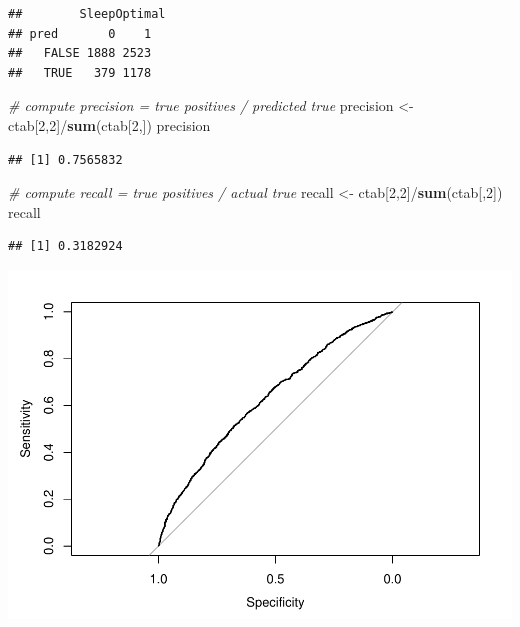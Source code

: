 \documentclass[]{article}
\newenvironment{Shaded}{\begin{snugshade}}{\end{snugshade}}
\newcommand{\KeywordTok}[1]{\textcolor[rgb]{0.13,0.29,0.53}{\textbf{{#1}}}}
\newcommand{\DecValTok}[1]{\textcolor[rgb]{0.00,0.00,0.81}{{#1}}}
\newcommand{\StringTok}[1]{\textcolor[rgb]{0.31,0.60,0.02}{{#1}}}
\newcommand{\CommentTok}[1]{\textcolor[rgb]{0.56,0.35,0.01}{\textit{{#1}}}}
\newcommand{\NormalTok}[1]{{#1}}
\begin{document}
\begin{verbatim}
##        SleepOptimal
## pred       0    1
##   FALSE 1888 2523
##   TRUE   379 1178
\end{verbatim}

\begin{Shaded}
\begin{Highlighting}[]
\CommentTok{# compute precision = true positives / predicted true}
\NormalTok{precision <-}\StringTok{ }\NormalTok{ctab[}\DecValTok{2}\NormalTok{,}\DecValTok{2}\NormalTok{]/}\KeywordTok{sum}\NormalTok{(ctab[}\DecValTok{2}\NormalTok{,])}
\NormalTok{precision}
\end{Highlighting}
\end{Shaded}

\begin{verbatim}
## [1] 0.7565832
\end{verbatim}

\begin{Shaded}
\begin{Highlighting}[]
\CommentTok{# compute recall = true positives / actual true}
\NormalTok{recall <-}\StringTok{ }\NormalTok{ctab[}\DecValTok{2}\NormalTok{,}\DecValTok{2}\NormalTok{]/}\KeywordTok{sum}\NormalTok{(ctab[,}\DecValTok{2}\NormalTok{])}
\NormalTok{recall}
\end{Highlighting}
\end{Shaded}

\begin{verbatim}
## [1] 0.3182924
\end{verbatim}

\begin{Shaded}
\end{Shaded}

\includegraphics{Hmwk7AnswerKey_files/figure-latex/unnamed-chunk-17-2.pdf}
\end{document}
